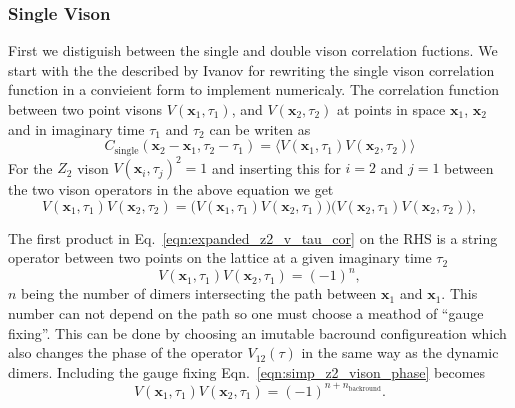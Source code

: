 \documentclass[twocolumn,prb,aps,floatfix,superscriptaddress]{revtex4-1}
\begin{document}
        \subsubsection{Single Vison}
            First we distiguish between the single and double vison correlation fuctions. We start with the
            the described by Ivanov \cite{Ivanov2004} for rewriting the single vison correlation function in a
            convieient form to implement numericaly. 
            The correlation function between two point visons $V(\bm{x}_1,\tau_1)$, and $V(\bm{x}_2,\tau_2)$ at 
            points in space $\bm{x}_1$, $\bm{x}_2$ and in imaginary time $\tau_1$ and $\tau_2$ can be writen as
            \begin{equation}
                C_{\mathrm{single}}(\bm{x}_2-\bm{x}_1,\tau_2 - \tau_1) = \langle V(\bm{x}_1,\tau_1) V(\bm{x}_2,\tau_2) \rangle
            \end{equation}
            For the $Z_2$ vison $V(\bm{x}_i,\tau_j)^2=1$ and inserting this for $i=2$ and $j=1$ between the two vison
            operators in the above equation we get 
            \begin{equation}
                V(\bm{x}_1,\tau_1) V(\bm{x}_2,\tau_2) = \big(V(\bm{x}_1,\tau_1) V(\bm{x}_2,\tau_1)\big)
                \big( V(\bm{x}_2,\tau_1) V(\bm{x}_2,\tau_2) \big),
                \label{eqn:expanded_z2_v_tau_cor}
            \end{equation}
            
            The first product in Eq.~\ref{eqn:expanded_z2_v_tau_cor} on the RHS is a 
            string operator between two points on the lattice at a given imaginary time $\tau_2$ 
            \begin{equation}
                V(\bm{x}_1,\tau_1) V(\bm{x}_2,\tau_1) = (-1)^{n},
                \label{eqn:simp_z2_vison_phase}
            \end{equation}
            $n$ being the number of dimers intersecting the path between $\bm{x}_1$ and $\bm{x}_1$. This number
            can not depend on the path so one must choose a meathod of ``gauge fixing''. This can be done
            by choosing an imutable bacround configureation which also changes the phase of the
            operator $V_{12}(\tau)$ in the same way as the dynamic dimers. 
            Including the gauge fixing Eqn.~\ref{eqn:simp_z2_vison_phase} becomes
            \begin{equation}
                V(\bm{x}_1,\tau_1) V(\bm{x}_2,\tau_1) = (-1)^{n+n_{\mathrm{backround}}}.
            \end{equation}
\end{document}
